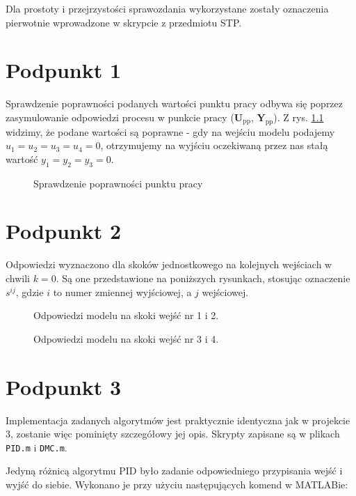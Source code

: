 \bigskip
\bigskip

Dla prostoty i przejrzystości sprawozdania wykorzystane zostały oznaczenia pierwotnie wprowadzone w skrypcie z przedmiotu STP.

\chapter{Podpunkt 1}
Sprawdzenie poprawności podanych wartości punktu pracy odbywa się poprzez zasymulowanie odpowiedzi procesu w punkcie pracy ($\boldsymbol{U}_{\mathrm{pp}}$, $\boldsymbol{Y}_{\mathrm{pp}}$). Z rys. \ref{Z1} widzimy, że podane wartości są poprawne - gdy na wejściu modelu podajemy $u_1=u_2=u_3=u_4=0$, otrzymujemy na wyjściu oczekiwaną przez nas stałą wartość $y_1=y_2=y_3=\num{0}$.

\begin{figure}[ht]
\centering

\caption{Sprawdzenie poprawności punktu pracy}
\label{Z1}
\end{figure}


\chapter{Podpunkt 2}


Odpowiedzi wyznaczono dla skoków jednostkowego na kolejnych wejściach w chwili $ k=0 $. Są one przedstawione na poniższych rysunkach, stosując oznaczenie $ s^{ij} $, gdzie $ i $ to numer zmiennej wyjściowej, a $ j $ wejściowej.

\begin{figure}[ht]
	\centering
	
	\caption{Odpowiedzi modelu na skoki wejść nr 1 i 2.}
	\label{Z2a}
\end{figure}

\begin{figure}[ht]
	\centering
	
	\caption{Odpowiedzi modelu na skoki wejść nr 3 i 4.}
	\label{Z2b}
\end{figure}

\chapter{Podpunkt 3}

Implementacja zadanych algorytmów jest praktycznie identyczna jak w projekcie 3, zostanie więc pominięty szczegółowy jej opis. Skrypty zapisane są w plikach \verb|PID.m| i \verb|DMC.m|.

Jedyną różnicą algorytmu PID było zadanie odpowiedniego przypisania wejść i wyjść do siebie. Wykonano je przy użyciu następujących komend w MATLABie: 

